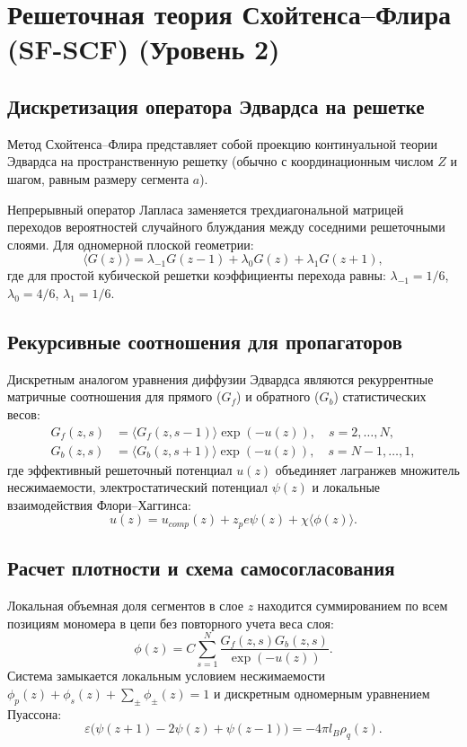 \documentclass[12pt,a4paper]{article}
\begin{document}
\section{Решеточная теория Схойтенса--Флира (SF-SCF) (Уровень 2)}

\subsection{Дискретизация оператора Эдвардса на решетке}
Метод Схойтенса--Флира представляет собой проекцию континуальной теории Эдвардса на пространственную решетку (обычно с координационным числом $Z$ и шагом, равным размеру сегмента $a$).

Непрерывный оператор Лапласа заменяется трехдиагональной матрицей переходов вероятностей случайного блуждания между соседними решеточными слоями. Для одномерной плоской геометрии:
\begin{equation}
\langle G(z) \rangle = \lambda_{-1} G(z-1) + \lambda_0 G(z) + \lambda_1 G(z+1),
\end{equation}
где для простой кубической решетки коэффициенты перехода равны: $\lambda_{-1} = 1/6$, $\lambda_0 = 4/6$, $\lambda_1 = 1/6$.

\subsection{Рекурсивные соотношения для пропагаторов}
Дискретным аналогом уравнения диффузии Эдвардса являются рекуррентные матричные соотношения для прямого ($G_f$) и обратного ($G_b$) статистических весов:
\begin{align}
G_f(z, s) &= \langle G_f(z, s-1) \rangle \exp(-u(z)), \quad s = 2, \dots, N, \\
G_b(z, s) &= \langle G_b(z, s+1) \rangle \exp(-u(z)), \quad s = N-1, \dots, 1,
\end{align}
где эффективный решеточный потенциал $u(z)$ объединяет лагранжев множитель несжимаемости, электростатический потенциал $\psi(z)$ и локальные взаимодействия Флори--Хаггинса:
\begin{equation}
u(z) = u_{comp}(z) + z_p e \psi(z) + \chi \langle \phi(z) \rangle.
\end{equation}

\subsection{Расчет плотности и схема самосогласования}
Локальная объемная доля сегментов в слое $z$ находится суммированием по всем позициям мономера в цепи без повторного учета веса слоя:
\begin{equation}
\phi(z) = C \sum_{s=1}^N \frac{G_f(z, s) G_b(z, s)}{\exp(-u(z))}.
\end{equation}
Система замыкается локальным условием несжимаемости $\phi_p(z) + \phi_s(z) + \sum_\pm \phi_\pm(z) = 1$ и дискретным одномерным уравнением Пуассона:
\begin{equation}
\varepsilon \Big( \psi(z+1) - 2\psi(z) + \psi(z-1) \Big) = -4\pi l_B \rho_q(z).
\end{equation}
\end{document}
